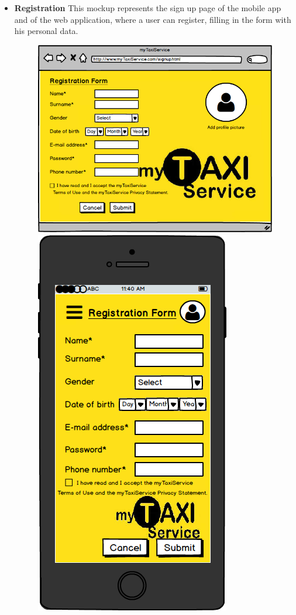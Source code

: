 \documentclass[18pt,oneside,a4paper, titlepage]{article}
\begin{document}
\begin{itemize}
\begin{figure}[h]
				\end{figure}
				\\
				\item \textbf{Registration} This mockup represents the sign up page of the mobile app and of the web application, where a user can register, filling in the form with his personal data.\\
				\begin{figure}[h]
					\includegraphics[scale=0.3]{Mockups/WebAppRegistration.png}%
					\qquad\qquad
					\includegraphics[scale=0.3]{Mockups/MobileAppRegistration.png}

\end{figure}
\end{itemize}
\end{document}
